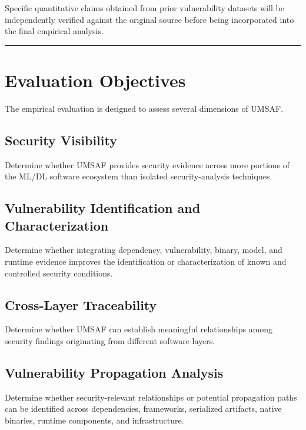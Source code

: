 \documentclass[
  12pt,
  letterpaper,
  oneside]{report}
\begin{document}
Specific quantitative claims obtained from prior vulnerability datasets
will be independently verified against the original source before being
incorporated into the final empirical analysis.

\begin{center}\rule{0.5\linewidth}{0.5pt}\end{center}

\section{Evaluation Objectives}\label{114-evaluation-objectives}

The empirical evaluation is designed to assess several dimensions of
UMSAF.

\subsection{Security Visibility}\label{1141-security-visibility}

Determine whether UMSAF provides security evidence across more portions
of the ML/DL software ecosystem than isolated security-analysis
techniques.

\subsection{Vulnerability Identification and Characterization}\label{1142-vulnerability-identification-and-characterization}

Determine whether integrating dependency, vulnerability, binary, model,
and runtime evidence improves the identification or characterization of
known and controlled security conditions.

\subsection{Cross-Layer Traceability}\label{1143-cross-layer-traceability}

Determine whether UMSAF can establish meaningful relationships among
security findings originating from different software layers.

\subsection{Vulnerability Propagation Analysis}\label{1144-vulnerability-propagation-analysis}

Determine whether security-relevant relationships or potential
propagation paths can be identified across dependencies, frameworks,
serialized artifacts, native binaries, runtime components, and
infrastructure.
\end{document}
